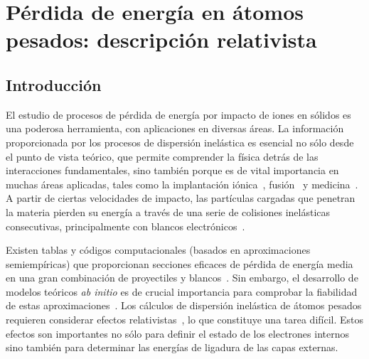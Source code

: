 \chapter{Pérdida de energía en átomos pesados: descripción relativista}
\label{chap:heavy}

\section{Introducción}
\label{sec:intro}

El estudio de procesos de pérdida de energía por impacto de iones 
en sólidos es una poderosa herramienta, con aplicaciones en diversas 
áreas. La información proporcionada por los procesos de dispersión 
inelástica es esencial no sólo desde el punto de vista teórico, que 
permite comprender la física detrás de las interacciones fundamentales, 
sino también porque es de vital importancia en muchas áreas aplicadas, 
tales como la implantación iónica~\cite{Creutzburg:19,Jeynes:16}, 
fusión~\cite{Mayer:20,He:17} y 
medicina~\cite{Schardt:10,AlcocerAvila:19,Vera:19}.
A partir de ciertas velocidades de impacto, las partículas cargadas que 
penetran la materia pierden su energía a través de una serie de 
colisiones inelásticas consecutivas, principalmente con blancos 
electrónicos~\cite{Chu:01,Sigmund:06}. 

Existen tablas y códigos computacionales (basados en aproximaciones 
semiempíricas) que proporcionan secciones eficaces de pérdida de energía 
media en una gran combinación de proyectiles y blancos~\cite{iaea_codes,
Paul:03}. Sin embargo, el desarrollo de modelos teóricos 
\textit{ab initio} es de crucial importancia para comprobar la 
fiabilidad de estas aproximaciones~\cite{Diwan:15,Damache:04,Damache:02}.
Los cálculos de dispersión inelástica de átomos pesados requieren 
considerar efectos relativistas~\cite{Montanari:09}, lo que constituye 
una tarea difícil. Estos efectos son importantes no sólo para definir el 
estado de los electrones internos sino también para determinar las 
energías de ligadura de las capas externas.

